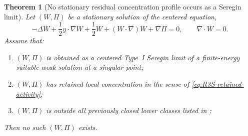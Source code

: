 \documentclass[11pt]{amsart}
\numberwithin{equation}{section}
\theoremstyle{plain}
\newtheorem{theorem}{Theorem}[section]
\theoremstyle{definition}
\theoremstyle{remark}
\begin{document}
\begin{theorem}[No stationary residual concentration profile occurs as a Seregin limit]
\label{thm:R3S-no-active-stationary-carrier}
Let \((W,\Pi)\) be a stationary solution of the centered equation,
\begin{equation}\label{eq:R3S-stationary-centered}
   -\Delta W+\frac12 y\cdot\nabla W+\frac12 W
   +(W\cdot\nabla)W+\nabla\Pi=0,
   \qquad \nabla\cdot W=0 .
\end{equation}
Assume that:
\begin{enumerate}[label=(\roman*)]
   \item \((W,\Pi)\) is obtained as a centered Type~I Seregin limit of a
   finite-energy suitable weak solution at a singular point;
   \item \((W,\Pi)\) has retained local concentration in the sense of
   \eqref{eq:R3S-retained-activity};
   \item \((W,\Pi)\) is outside all previously closed lower classes listed in
   ;
\end{enumerate}
Then no such \((W,\Pi)\) exists.
\end{theorem}
\end{document}
